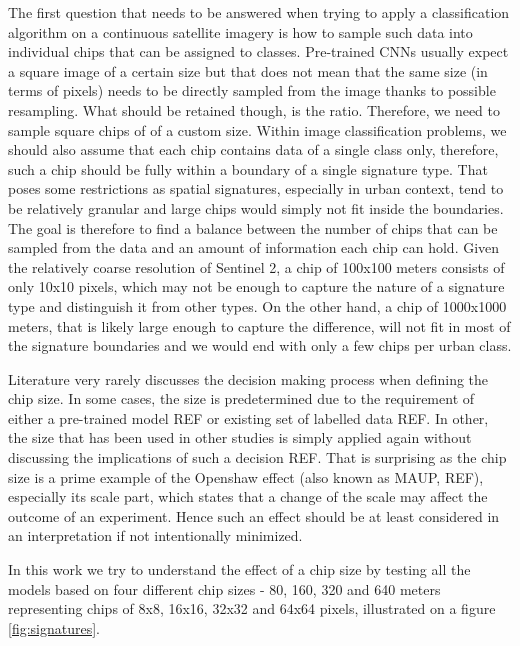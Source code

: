 The first question that needs to be answered when trying to apply a classification
algorithm on a continuous satellite imagery is how to sample such data into individual
chips that can be assigned to classes. Pre-trained CNNs usually expect a square image of
a certain size but that does not mean that the same size (in terms of pixels) needs to
be directly sampled from the image thanks to possible resampling. What should be
retained though, is the ratio. Therefore, we need to sample square chips of of a custom
size. Within image classification problems, we should also assume that each chip
contains data of a single class only, therefore, such a chip should be fully within a
boundary of a single signature type. That poses some restrictions as spatial signatures,
especially in urban context, tend to be relatively granular and large chips would simply
not fit inside the boundaries. The goal is therefore to find a balance between the
number of chips that can be sampled from the data and an amount of information each chip
can hold. Given the relatively coarse resolution of Sentinel 2, a chip of 100x100 meters
consists of only 10x10 pixels, which may not be enough to capture the nature of a
signature type and distinguish it from other types. On the other hand, a chip of
1000x1000 meters, that is likely large enough to capture the difference, will not fit in
most of the signature boundaries and we would end with only a few chips per urban class.

Literature very rarely discusses the decision making process when defining the chip
size. In some cases, the size is predetermined due to the requirement of either a
pre-trained model REF or existing set of labelled data REF. In other, the size that has
been used in other studies is simply applied again without discussing the implications
of such a decision REF. That is surprising as the chip size is a prime example of the
Openshaw effect (also known as MAUP, REF), especially its scale part, which states that
a change of the scale may affect the outcome of an experiment. Hence such an effect
should be at least considered in an interpretation if not intentionally minimized.

In this work we try to understand the effect of a chip size by testing all the models
based on four different chip sizes - 80, 160, 320 and 640 meters representing chips of
8x8, 16x16, 32x32 and 64x64 pixels, illustrated on a figure \ref{fig:signatures}.


